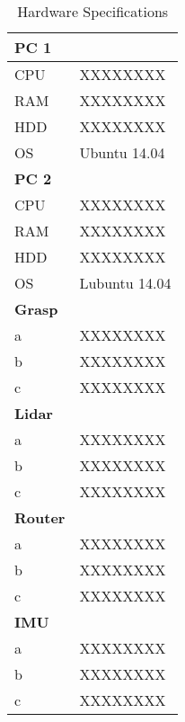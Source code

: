 \begin{table}[h]
	\caption{Hardware Specifications}
	\centering
	\begin{tabular}{ | p{2cm} | p{3cm} | }
		\hline
		\bfseries{PC 1} &  \\
		\hline
		CPU & XXXXXXXX \\
		RAM & XXXXXXXX \\
		HDD & XXXXXXXX \\
		OS & Ubuntu 14.04 \\
		\hline \hline
		\bfseries{PC 2} &  \\
		\hline
		CPU & XXXXXXXX \\
		RAM & XXXXXXXX \\
		HDD & XXXXXXXX \\
		OS & Lubuntu 14.04 \\
		\hline \hline
		\bfseries{Grasp} &  \\
		\hline
		a & XXXXXXXX \\
		b & XXXXXXXX \\
		c & XXXXXXXX \\
		\hline \hline
		\bfseries{Lidar} &  \\
		\hline
		a & XXXXXXXX \\
		b & XXXXXXXX \\
		c & XXXXXXXX \\
		\hline \hline
		\bfseries{Router} &  \\
		\hline
		a & XXXXXXXX \\
		b & XXXXXXXX \\
		c & XXXXXXXX \\
		\hline \hline
		\bfseries{IMU} &  \\
		\hline
		a & XXXXXXXX \\
		b & XXXXXXXX \\
		c & XXXXXXXX \\
		\hline
	\end{tabular}
	\label{tab:hw}
\end{table}

